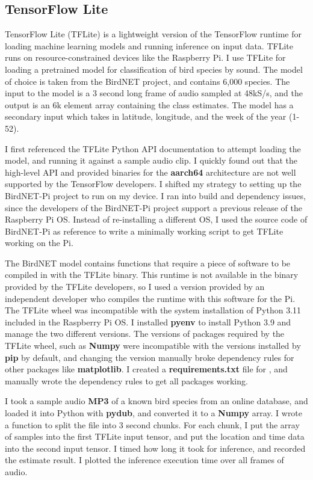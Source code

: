 \documentclass[12pt]{article}
\begin{document}
\subsection{TensorFlow Lite}
	
	TensorFlow Lite (TFLite) is a lightweight version of the TensorFlow runtime for loading machine learning models and running inference on input data. TFLite runs on resource-constrained devices like the Raspberry Pi. I use TFLite for loading a pretrained model for classification of bird species by sound. The model of choice is taken from the BirdNET project, and contains 6,000 species. The input to the model is a 3 second long frame of audio sampled at 48kS/s, and the output is an 6k element array containing the class estimates. The model has a secondary input which takes in latitude, longitude, and the week of the year (1-52).
	
	I first referenced the TFLite Python API documentation to attempt loading the model, and running it against a sample audio clip. I quickly found out that the high-level API and provided binaries for the \textbf{aarch64} architecture are not well supported by the TensorFlow developers. I shifted my strategy to setting up the BirdNET-Pi project to run on my device. I ran into build and dependency issues, since the developers of the BirdNET-Pi project support a previous release of the Raspberry Pi OS. Instead of re-installing a different OS, I used the source code of BirdNET-Pi as reference to write a minimally working script to get TFLite working on the Pi.
	
	The BirdNET model contains functions that require a piece of software to be compiled in with the TFLite binary. This runtime is not available in the binary provided by the TFLite developers, so I used a version provided by an independent developer who compiles the runtime with this software for the Pi. The TFLite wheel was incompatible with the system installation of Python 3.11 included in the Raspberry Pi OS. I installed \textbf{pyenv} to install Python 3.9 and manage the two different versions. The versions of packages required by the TFLite wheel, such as \textbf{Numpy} were incompatible with the versions installed by \textbf{pip} by default, and changing the version manually broke dependency rules for other packages like \textbf{matplotlib}. I created a \textbf{requirements.txt} file for , and manually wrote the dependency rules  to get all packages working.
	
	I took a sample audio \textbf{MP3} of a known bird species from an online database, and loaded it into Python with \textbf{pydub}, and converted it to a \textbf{Numpy} array. I wrote a function to split the file into 3 second chunks. For each chunk, I put the array of samples into the first TFLite input tensor, and put the location and time data into the second input tensor. I timed how long it took for inference, and recorded the estimate result. I plotted the inference execution time over all frames of audio.
	
\end{document}
